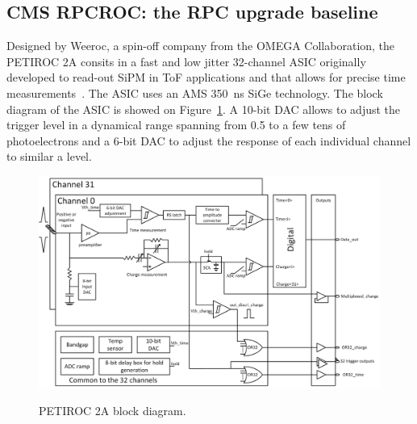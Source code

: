 	\subsection{CMS RPCROC: the RPC upgrade baseline}
	\label{chapt6:ssec:RPCROC}
	
	Designed by Weeroc, a spin-off company from the OMEGA Collaboration, the PETIROC 2A consits in a fast and low jitter 32-channel ASIC originally developed to read-out \acf{SiPM} in ToF applications and that allows for precise time measurements~\cite{PETIROCIEEE,PETIROCTWEPP}. The ASIC uses an AMS \SI{350}{ns} \acf{SiGe} technology. The block diagram of the ASIC is showed on Figure~\ref{fig:PETIROCASIC}. A 10-bit DAC allows to adjust the trigger level in a dynamical range spanning from 0.5 to a few tens of photoelectrons and a 6-bit DAC to adjust the response of each individual channel to similar a level.
	
	\begin{figure}[H]
		\centering
		\includegraphics[width = \linewidth]{fig/chapt6/petiroc2.png}\\
		\caption{\label{fig:PETIROCASIC} PETIROC 2A block diagram.}
	\end{figure}
	
